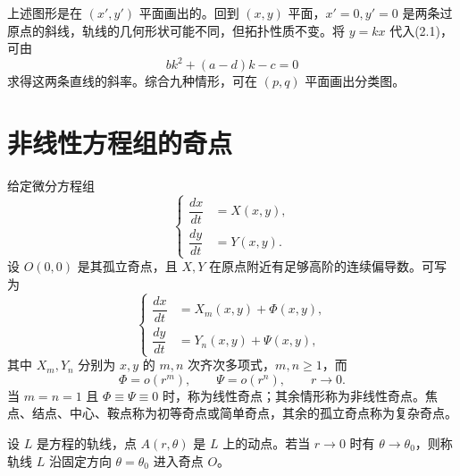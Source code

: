 上述图形是在 $(x',y')$ 平面画出的。回到 $(x,y)$ 平面，$x'=0,y'=0$ 是两条过原点的斜线，轨线的几何形状可能不同，但拓扑性质不变。将 $y=kx$ 代入(2.1)，可由
\[
bk^2+(a-d)k-c=0
\]
求得这两条直线的斜率。综合九种情形，可在 $(p,q)$ 平面画出分类图。

\begin{center}
\end{center}

\section{非线性方程组的奇点}

给定微分方程组
\[
\left\{\begin{aligned}
\dfrac{dx}{dt}&=X(x,y),\\
\dfrac{dy}{dt}&=Y(x,y).
\end{aligned}\right.\tag{3.1}
\]
设 $O(0,0)$ 是其孤立奇点，且 $X,Y$ 在原点附近有足够高阶的连续偏导数。可写为
\[
\left\{\begin{aligned}
\dfrac{dx}{dt}&=X_m(x,y)+\Phi(x,y),\\
\dfrac{dy}{dt}&=Y_n(x,y)+\Psi(x,y),
\end{aligned}\right.\tag{3.2}
\]
其中 $X_m,Y_n$ 分别为 $x,y$ 的 $m,n$ 次齐次多项式，$m,n\ge1$，而
\[
\Phi=o(r^m),\qquad\Psi=o(r^n),\qquad r\to0.
\]
当 $m=n=1$ 且 $\Phi\equiv\Psi\equiv0$ 时，称为线性奇点；其余情形称为非线性奇点。焦点、结点、中心、鞍点称为初等奇点或简单奇点，其余的孤立奇点称为复杂奇点。

\begin{definition}{}{}
设 $L$ 是方程的轨线，点 $A(r,\theta)$ 是 $L$ 上的动点。若当 $r\to0$ 时有 $\theta\to\theta_0$，则称轨线 $L$ 沿固定方向 $\theta=\theta_0$ 进入奇点 $O$。
\end{definition}

